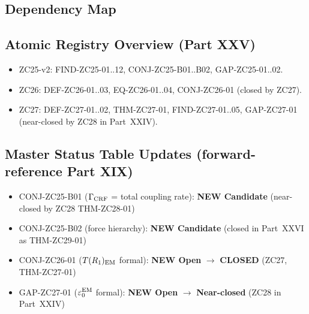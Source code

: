 \documentclass[12pt, a4paper]{article}
\begin{document}
\subsection*{Dependency Map}

\begin{center}
\end{center}

\subsection*{Atomic Registry Overview (Part XXV)}

\begin{itemize}[leftmargin=*, noitemsep]
\item ZC25-v2: FIND-ZC25-01..12, CONJ-ZC25-B01..B02, GAP-ZC25-01..02.
\item ZC26: DEF-ZC26-01..03, EQ-ZC26-01..04, CONJ-ZC26-01
  (closed by ZC27).
\item ZC27: DEF-ZC27-01..02, THM-ZC27-01, FIND-ZC27-01..05,
  GAP-ZC27-01 (near-closed by ZC28 in Part~XXIV).
\end{itemize}

\subsection*{Master Status Table Updates (forward-reference Part XIX)}

\begin{itemize}[leftmargin=*, noitemsep]
\item CONJ-ZC25-B01 ($\Gamma_{\rm CRF}$ = total coupling rate):
  \textbf{NEW Candidate} (near-closed by ZC28 THM-ZC28-01)
\item CONJ-ZC25-B02 (force hierarchy): \textbf{NEW Candidate}
  (closed in Part~XXVI as THM-ZC29-01)
\item CONJ-ZC26-01 ($T(R_1)_{\rm EM}$ formal): \textbf{NEW Open} $\to$
  \textbf{CLOSED} (ZC27, THM-ZC27-01)
\item GAP-ZC27-01 ($\varepsilon_0^{\rm EM}$ formal): \textbf{NEW Open} $\to$
  \textbf{Near-closed} (ZC28 in Part~XXIV)
\end{itemize}
\end{document}
